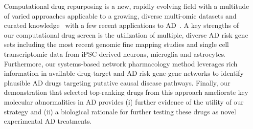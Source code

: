 \documentclass[letterpaper]{article}
\begin{document}
Computational drug repurposing is a new, rapidly evolving field with a
multitude of varied approaches applicable to a growing, diverse multi-omic
datasets and curated knowledge~\citep{Pushpakom2019} with a few recent
applications to AD~\citep{Taubes2021,Fang2021}. A key strengths of our
computational drug screen is the utilization of multiple, diverse AD risk gene sets
including the most recent genomic fine mapping studies and single cell
transcriptomic data from iPSC-derived neurons, microglia and astrocytes.
Furthermore, our systems-based network pharmacology method leverages rich
information in available drug-target and AD risk gene-gene networks to identify
plausible AD drugs targeting putative causal disease pathways. Finally, our
demonstration that selected top-ranking drugs from this approach ameliorate
key molecular abnormalities in AD provides (i) further evidence of the utility
of our strategy and (ii) a biological rationale for further testing these
drugs as novel experimental AD treatments.

\end{document}
